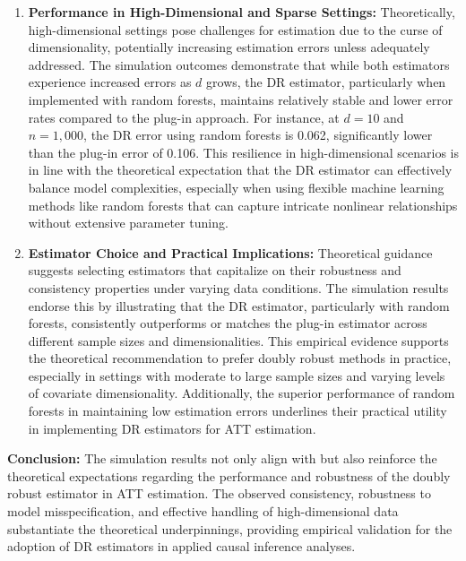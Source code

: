 \documentclass{article}
\begin{document}
\begin{enumerate}
    \item \textbf{Performance in High-Dimensional and Sparse Settings:}
    Theoretically, high-dimensional settings pose challenges for estimation due to the curse of dimensionality, potentially increasing estimation errors unless adequately addressed. The simulation outcomes demonstrate that while both estimators experience increased errors as \( d \) grows, the DR estimator, particularly when implemented with random forests, maintains relatively stable and lower error rates compared to the plug-in approach. For instance, at \( d = 10 \) and \( n = 1,000 \), the DR error using random forests is 0.062, significantly lower than the plug-in error of 0.106. This resilience in high-dimensional scenarios is in line with the theoretical expectation that the DR estimator can effectively balance model complexities, especially when using flexible machine learning methods like random forests that can capture intricate nonlinear relationships without extensive parameter tuning.

    \item \textbf{Estimator Choice and Practical Implications:}
    Theoretical guidance suggests selecting estimators that capitalize on their robustness and consistency properties under varying data conditions. The simulation results endorse this by illustrating that the DR estimator, particularly with random forests, consistently outperforms or matches the plug-in estimator across different sample sizes and dimensionalities. This empirical evidence supports the theoretical recommendation to prefer doubly robust methods in practice, especially in settings with moderate to large sample sizes and varying levels of covariate dimensionality. Additionally, the superior performance of random forests in maintaining low estimation errors underlines their practical utility in implementing DR estimators for ATT estimation.

\end{enumerate}

\textbf{Conclusion:} The simulation results not only align with but also reinforce the theoretical expectations regarding the performance and robustness of the doubly robust estimator in ATT estimation. The observed consistency, robustness to model misspecification, and effective handling of high-dimensional data substantiate the theoretical underpinnings, providing empirical validation for the adoption of DR estimators in applied causal inference analyses.
\end{document}
